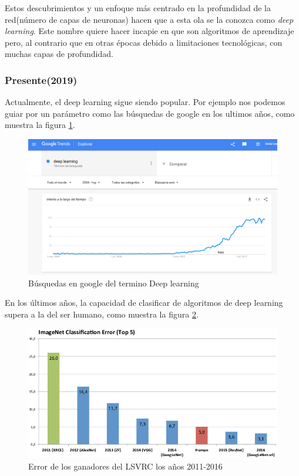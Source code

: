\documentclass[12pt]{article}
\numberwithin{equation}{section}
\begin{document}
Estos descubrimientos y un enfoque más centrado en la profundidad de la red(número de capas de neuronas) hacen que a esta ola se la conozca como \textit{deep learning}. Este nombre quiere hacer incapie en que son algoritmos de aprendizaje pero, al contrario que en otras épocas debido a limitaciones tecnológicas, con muchas capas de profundidad.

\subsubsection{Presente(2019)}

Actualmente, el deep learning sigue siendo popular. Por ejemplo nos podemos guiar por un parámetro como las búsquedas de google en los ultimos años, como muestra la figura \ref{fig:growth}.

\begin{figure}[h]
    \centering
    \includegraphics[width=1\textwidth]{growth.png}
    \caption{Búsquedas en google del termino Deep learning}
    \label{fig:growth}
\end{figure}

En los últimos años, la capacidad de clasificar de algoritmos de deep learning supera a la del ser humano\cite{DBLP:journals/corr/YangH15}, como muestra la figura \ref{fig:errorLSVRC}.


\begin{figure}[h]
    \centering
    \includegraphics[width=1\textwidth]{Winner-results-of-the-ImageNet-large-scale-visual-recognition-challenge-LSVRC-of-the.png}
    \caption{Error de los ganadores del LSVRC los años 2011-2016}
    \label{fig:errorLSVRC}
\end{figure}
\end{document}
